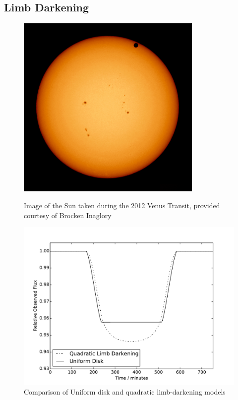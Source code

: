 \subsection{Limb Darkening}
\begin{figure}[ht]
    \centering
    \begin{minipage}[b]{\figwidth}
        \centering
        \includegraphics[width=0.8\textwidth]{images/venus_transit.jpg}
        \caption{Image of the Sun taken during the 2012 Venus Transit, provided courtesy of Brocken Inaglory}
        \label{fig:limb_darkening_image}
    \end{minipage}\quad\quad
    \begin{minipage}[b]{\figwidth}
        \includegraphics[width=\textwidth]{images/model_comparison.pdf}
        \caption{Comparison of Uniform disk and quadratic limb-darkening models}
        \label{fig:model_comparison}
    \end{minipage}
\end{figure}

